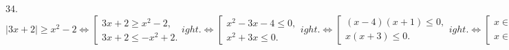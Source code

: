 34. $|3x+2|\geqslant x^2-2\Leftrightarrow\left[\begin{array}{l}3x+2\geqslant x^2-2,\\ 3x+2\leqslant -x^2+2.\end{array}
ight.\Leftrightarrow
\left[\begin{array}{l}x^2-3x-4\leqslant 0,\\ x^2+3x\leqslant 0.\end{array}
ight.\Leftrightarrow
\left[\begin{array}{l}(x-4)(x+1)\leqslant 0,\\ x(x+3)\leqslant 0.\end{array}
ight.
\Leftrightarrow
\left[\begin{array}{l}x\in[-1;4],\\ x\in[-3;0].\end{array}
ight.\Leftrightarrow
x\in[-3;4].$\\
